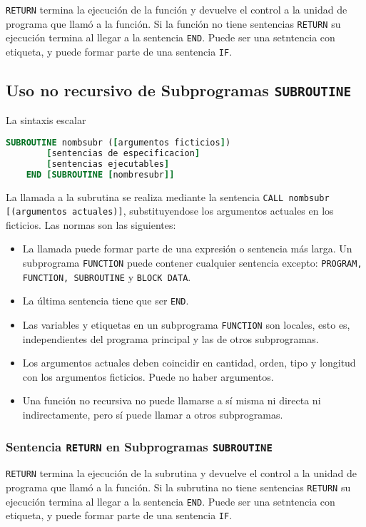 {\tt RETURN} termina la ejecución de la función y devuelve el control a la unidad de programa que llamó a la función. Si la función no tiene sentencias {\tt RETURN} su ejecución termina al llegar a la sentencia {\tt END}. Puede ser una setntencia con etiqueta, y puede formar parte de una sentencia {\tt IF}.

\subsection{Uso no recursivo de Subprogramas {\tt SUBROUTINE}}

La sintaxis escalar

\begin{lstlisting}[language=Fortran]
	SUBROUTINE nombsubr ([argumentos ficticios])
		[sentencias de especificacion]
		[sentencias ejecutables]
	END [SUBROUTINE [nombresubr]]
\end{lstlisting}

La llamada a la subrutina se realiza mediante la sentencia {\tt CALL nombsubr [(argumentos actuales)]}, substituyendose los argumentos actuales en los ficticios. Las normas son las siguientes:

\begin{itemize}
	\item La llamada puede formar parte de una expresión o sentencia más larga. Un subprograma {\tt FUNCTION} puede contener cualquier sentencia excepto: {\tt PROGRAM, FUNCTION, SUBROUTINE} y {\tt BLOCK DATA}.
	\item La última sentencia tiene que ser {\tt END}. 
	\item Las variables y etiquetas en un subprograma {\tt FUNCTION} son locales, esto es, independientes del programa principal y las de otros subprogramas. 
	\item Los argumentos actuales deben coincidir en cantidad, orden, tipo y longitud con los argumentos ficticios. Puede no haber argumentos.
	\item Una función no recursiva no puede llamarse a sí misma ni directa ni indirectamente, pero sí puede llamar a otros subprogramas.
\end{itemize}

\subsubsection{Sentencia {\tt RETURN} en Subprogramas {\tt SUBROUTINE}}

{\tt RETURN} termina la ejecución de la subrutina y devuelve el control a la unidad de programa que llamó a la función. Si la subrutina no tiene sentencias {\tt RETURN} su ejecución termina al llegar a la sentencia {\tt END}. Puede ser una setntencia con etiqueta, y puede formar parte de una sentencia {\tt IF}.

